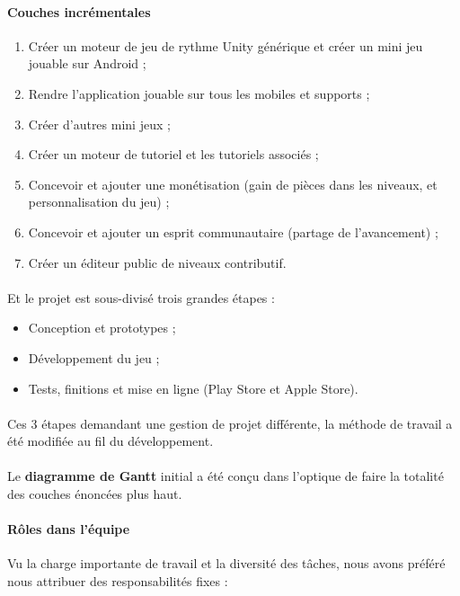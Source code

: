 \paragraph{Couches incrémentales}
\begin{enumerate}
\item Créer un moteur de jeu de rythme Unity générique et créer un mini jeu jouable sur Android ;
\item Rendre l’application jouable sur tous les mobiles et supports ;
\item Créer d’autres mini jeux ;
\item Créer un moteur de tutoriel et les tutoriels associés ;
\item Concevoir et ajouter une monétisation (gain de pièces dans les niveaux, et personnalisation du jeu) ;
\item Concevoir et ajouter un esprit communautaire (partage de l’avancement) ;
\item Créer un éditeur public de niveaux contributif.
\end{enumerate}

\paragraph{}
Et le projet est sous-divisé trois grandes étapes :
\begin{itemize}
\item Conception et prototypes ;
\item Développement du jeu ;
\item Tests, finitions et mise en ligne (Play Store et Apple Store).
\end{itemize}

\paragraph{}
Ces 3 étapes demandant une gestion de projet différente, la méthode de travail a été modifiée au fil du développement.

\paragraph{}
Le \textbf{diagramme de Gantt} initial a été conçu dans l’optique de faire la totalité des couches énoncées plus haut.

\paragraph{Rôles dans l’équipe}
Vu la charge importante de travail et la diversité des tâches, nous avons préféré nous attribuer des responsabilités fixes :

